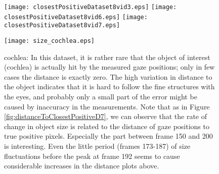 \begin{figure}[ht]
	  \texttt{[image: closestPositiveDataset8vid3.eps]}
	  \texttt{[image: closestPositiveDataset8vid6.eps]}
	  \texttt{[image: closestPositiveDataset8vid7.eps]}
	  
	  \vspace{3mm}
	  \texttt{[image: size\_cochlea.eps]}	  
	  \caption{cochlea: In this dataset, it is rather rare that the object of interest (cochlea) is actually hit by the measured gaze positions; only in few cases the distance is exactly zero. The high variation in distance to the object indicates that it is hard to follow the fine structures with the eyes, and probably only a small part of the error might be caused by inaccuracy in the measurements. Note that as in Figure \ref{fig:distanceToClosestPositiveD7}, we can observe that the rate of change in object size is related to the distance of gaze positions to true positive pixels. Especially the part between frame 150 and 200 is interesting. Even the little period (frames 173-187) of size fluctuations before the peak at frame 192 seems to cause considerable increases in the distance plots above.}
	\label{fig:distanceToClosestPositiveD8}
\end{figure}

